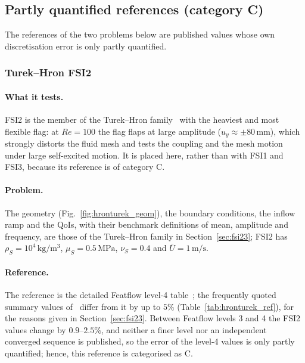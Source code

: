 \subsection{Partly quantified references (category C)}\label{sec:partly_quantified_refs}

The references of the two problems below are published values whose own discretisation error is only partly quantified.

\subsubsection{Turek--Hron FSI2}\label{sec:fsi2}

\paragraph{What it tests.}
FSI2 is the member of the Turek--Hron family~\citep{Turek2006} with the heaviest and most flexible flag: at $Re = 100$ the flag flaps at large amplitude ($u_y \approx \pm80\,\mathrm{mm}$), which strongly distorts the fluid mesh and tests the coupling and the mesh motion under large self-excited motion.
It is placed here, rather than with FSI1 and FSI3, because its reference is of category C.

\paragraph{Problem.}
The geometry (Fig.~\ref{fig:hronturek_geom}), the boundary conditions, the inflow ramp and the QoIs, with their benchmark definitions of mean, amplitude and frequency, are those of the Turek--Hron family in Section~\ref{sec:fsi23}; FSI2 has $\rho_S = 10^4\,\mathrm{kg/m^3}$, $\mu_S = 0.5\,\mathrm{MPa}$, $\nu_S = 0.4$ and $\bar{U} = 1\,\mathrm{m/s}$.

\paragraph{Reference.}
The reference is the detailed Featflow level-4 table~\citep{FeatflowFSI,Turek2010}; the frequently quoted summary values of~\citet{Turek2006} differ from it by up to $5\%$ (Table~\ref{tab:hronturek_ref}), for the reasons given in Section~\ref{sec:fsi23}.
Between Featflow levels 3 and 4 the FSI2 values change by $0.9$--$2.5\%$, and neither a finer level nor an independent converged sequence is published, so the error of the level-4 values is only partly quantified; hence, this reference is categorised as C.

